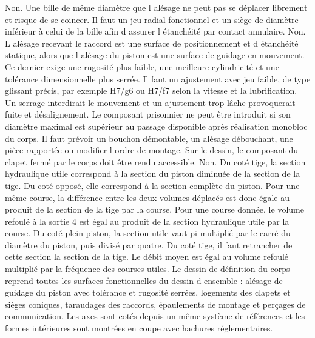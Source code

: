 \begin{corrigebox}
Non. Une bille de même diamètre que l alésage ne peut pas se déplacer librement et risque de se coincer. Il faut un jeu radial fonctionnel et un siège de diamètre inférieur à celui de la bille afin d assurer l étanchéité par contact annulaire.
Non. L alésage recevant le raccord est une surface de positionnement et d étanchéité statique, alors que l alésage du piston est une surface de guidage en mouvement. Ce dernier exige une rugosité plus faible, une meilleure cylindricité et une tolérance dimensionnelle plus serrée.
Il faut un ajustement avec jeu faible, de type glissant précis, par exemple H7/g6 ou H7/f7 selon la vitesse et la lubrification. Un serrage interdirait le mouvement et un ajustement trop lâche provoquerait fuite et désalignement.
Le composant prisonnier ne peut être introduit si son diamètre maximal est supérieur au passage disponible après réalisation monobloc du corps. Il faut prévoir un bouchon démontable, un alésage débouchant, une pièce rapportée ou modifier l ordre de montage. Sur le dessin, le composant du clapet fermé par le corps doit être rendu accessible.
Non. Du coté tige, la section hydraulique utile correspond à la section du piston diminuée de la section de la tige. Du coté opposé, elle correspond à la section complète du piston. Pour une même course, la différence entre les deux volumes déplacés est donc égale au produit de la section de la tige par la course.
Pour une course donnée, le volume refoulé à la sortie 4 est égal au produit de la section hydraulique utile par la course. Du coté plein piston, la section utile vaut pi multiplié par le carré du diamètre du piston, puis divisé par quatre. Du coté tige, il faut retrancher de cette section la section de la tige. Le débit moyen est égal au volume refoulé multiplié par la fréquence des courses utiles.
Le dessin de définition du corps reprend toutes les surfaces fonctionnelles du dessin d ensemble : alésage de guidage du piston avec tolérance et rugosité serrées, logements des clapets et sièges coniques, taraudages des raccords, épaulements de montage et perçages de communication. Les axes sont cotés depuis un même système de références et les formes intérieures sont montrées en coupe avec hachures réglementaires.
\end{corrigebox}
